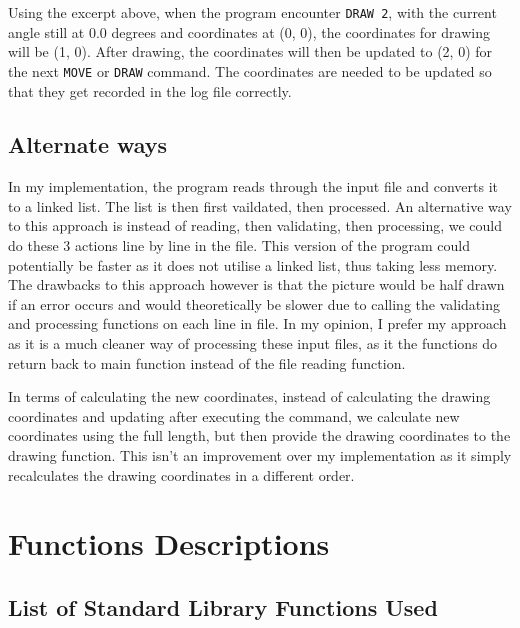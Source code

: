 \documentclass[a4paper, 12pt, titlepage]{article}
\newcommand{\code}[1]{\small\texttt{#1}\normalsize}
\begin{document}
Using the excerpt above, when the program encounter \code{DRAW 2}, 
with the current angle still at 0.0 degrees and coordinates at (0, 0), 
the coordinates for drawing will be (1, 0). After drawing, the coordinates 
will then be updated to (2, 0) for the next \code{MOVE} or \code{DRAW} 
command. The coordinates are needed to be updated so that they get recorded 
in the log file correctly.

\subsection{Alternate ways}

In my implementation, the program reads through the input file and converts 
it to a linked list. The list is then first vaildated, then processed. An 
alternative way to this approach is instead of reading, then validating, 
then processing, we could do these 3 actions line by line in the file. 
This version of the program could potentially be faster as it does not 
utilise a linked list, thus taking less memory. The drawbacks to this 
approach however is that the picture would be half drawn if an error occurs 
and would theoretically be slower due to calling the validating and 
processing functions on each line in file. In my opinion, I prefer my 
approach as it is a much cleaner way of processing these input files, as 
it the functions do return back to main function instead of the file reading 
function.

In terms of calculating the new coordinates, instead of calculating the 
drawing coordinates and updating after executing the command, we calculate 
new coordinates using the full length, but then provide the drawing 
coordinates to the drawing function. This isn't an improvement over my 
implementation as it simply recalculates the drawing coordinates in a 
different order.

\newpage


\section{Functions Descriptions}

\subsection{List of Standard Library Functions Used}
\end{document}
